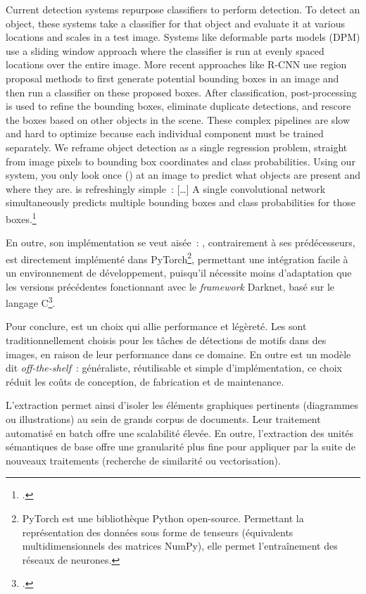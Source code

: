 \begin{kwote}                 
Current detection systems repurpose classifiers to perform detection. To
detect an object, these systems take a classifier for that object and
evaluate it at various locations and scales in a test image. Systems
like deformable parts models (DPM) use a sliding window approach where
the classifier is run at evenly spaced locations over the entire image.
More recent approaches like R-CNN use region proposal methods to first
generate potential bounding boxes in an image and then run a classifier
on these proposed boxes. After classification, post-processing is used
to refine the bounding boxes, eliminate duplicate detections, and
rescore the boxes based on other objects in the scene. These complex
pipelines are slow and hard to optimize because each individual
component must be trained separately. We reframe object detection as a
single regression problem, straight from image pixels to bounding box
coordinates and class probabilities. Using our system, you only look
once (\yolo) at an image to predict what objects are present and where
they are. \yolo is refreshingly simple~: {[}\ldots{]} A single
convolutional network simultaneously predicts multiple bounding boxes
and class probabilities for those boxes.\footcite[p.1]{redmon_you_2016}
                       \end{kwote}

En outre, son implémentation se veut aisée~: \yolov, contrairement à ses
prédécesseurs, est directement implémenté dans PyTorch\footnote{PyTorch est une
bibliothèque Python open-source. Permettant la représentation des
données sous forme de tenseurs (équivalents multidimensionnels des
matrices NumPy), elle permet l'entraînement des réseaux de neurones.},
permettant une intégration facile à un environnement de développement,
puisqu'il nécessite moins d'adaptation que les versions précédentes
fonctionnant avec le \textit{framework} Darknet, basé sur le langage
C\footcite[p.44]{norindr_traitement_2023}.

Pour conclure, \yolo est un choix qui allie performance et légèreté. Les
\cnns sont traditionnellement choisis pour les tâches de détections de
motifs dans des images, en raison de leur performance dans ce domaine.
En outre \yolo est un modèle dit \emph{off-the-shelf}~: généraliste,
réutilisable et simple d'implémentation, ce choix réduit les coûts de
conception, de fabrication et de maintenance.

L'extraction permet ainsi d'isoler les éléments graphiques pertinents
(diagrammes ou illustrations) au sein de grands corpus de documents.
Leur traitement automatisé en batch offre une scalabilité élevée. En
outre, l'extraction des unités sémantiques de base offre une granularité
plus fine pour appliquer par la suite de nouveaux traitements (recherche
de similarité ou vectorisation).

